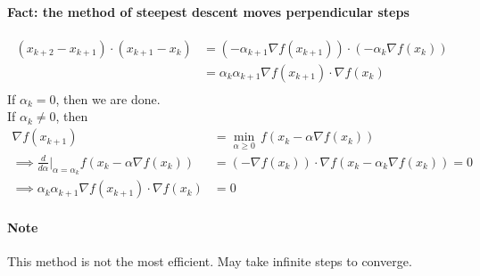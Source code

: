 \documentclass[11pt]{article}
\begin{document}
\paragraph{Fact: the method of steepest descent moves perpendicular steps}
\begin{align}
	(x_{k+2} - x_{k+1}) \cdot (x_{k+1} - x_k) &= (-\alpha_{k+1}\nabla f(x_{k+1}))\cdot(-\alpha_k \nabla f(x_k)) \\
	&= \alpha_k \alpha_{k+1} \nabla f(x_{k+1})\cdot \nabla f(x_k) \\
\end{align}
If $\alpha_k = 0$, then we are done. \\
If $\alpha_k \neq 0$, then 
\begin{align}
	\nabla f(x_{k+1}) &= \underset{\alpha \geq 0}{\min}\, f(x_k - \alpha \nabla f(x_k)) \\
\implies \frac{d}{d\alpha}|_{\alpha = \alpha_k} f(x_k - \alpha \nabla f(x_k)) &= (- \nabla f(x_k)) \cdot \nabla f(x_k - \alpha_k \nabla f(x_k)) = 0 \\
\implies \alpha_k \alpha_{k+1} \nabla f(x_{k+1})\cdot \nabla f(x_k) &= 0
\end{align}

\paragraph{Note}
This method is not the most efficient. May take infinite steps to converge.
\end{document}
